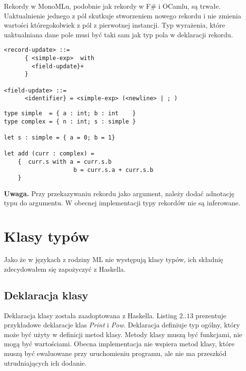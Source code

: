 \documentclass[declaration,shortabstract]{iithesis}
\begin{document}
Rekordy w MonoMLu, podobnie jak rekordy w F\# i OCamlu, 
są trwałe. 
Uaktualnienie jednego z pól skutkuje stworzeniem nowego rekordu i nie zmienia 
wartości któregokolwiek z pól z pierwotnej instancji. 
Typ wyrażenia, które uaktualniana dane pole musi być taki sam jak typ pola 
w deklaracji rekordu.

\begin{lstlisting}[frame=single, caption=Wyrażenia warunkowe.]
<record-update> ::=
      { <simple-exp>  with 
        <field-update}+ 
      }

<field-update> ::=
      <identifier} = <simple-exp> (<newline> | ; )
\end{lstlisting}

\begin{lstlisting}[frame=single, caption=Uaktualnianie rekordu.]
type simple  = { a : int; b : int    }
type complex = { n : int; s : simple }

let s : simple = { a = 0; b = 1}

let add (curr : complex) = 
    {  curr.s with a = curr.s.b
                    b = curr.s.a + curr.s.b 
    }
\end{lstlisting}

\textbf{Uwaga.} Przy przekazywaniu rekordu jako argument, należy dodać 
adnotację typu do argumentu. W obecnej implementacji typy rekordów nie są 
inferowane.

\section{Klasy typów}

Jako że w językach z rodziny ML nie występują klasy typów, ich składnię
zdecydowałem się zapożyczyć z Haskella.

\subsection{Deklaracja klasy}

Deklaracja klasy została zaadoptowana z Haskella. Listing $2..13$ prezentuje 
przykładowe deklaracje klas \textit{Print} i \textit{Pow}. Deklaracja 
definiuje typ ogólny, który może być użyty w definicji metod klasy.
Metody klasy muszą być funkcjami, nie mogą być wartościami. Obecna implementacja
nie wspiera metod klasy, które muszą być ewaluowane przy uruchomieniu programu, 
ale nie ma przeszkód utrudniających ich dodanie.
\end{document}
